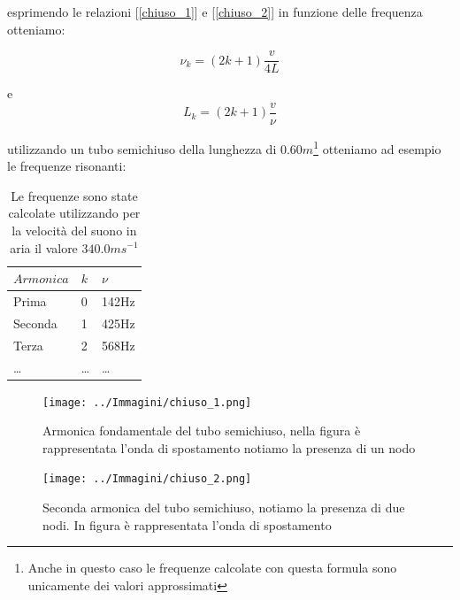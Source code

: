 \documentclass[a4paper,10pt,oneside]{article}
\begin{document}
esprimendo le relazioni [\ref{chiuso_1}] e [\ref{chiuso_2}] in funzione delle frequenza otteniamo:

\begin{equation}
 \nu_k=(2k+1)\frac{v}{4L}
\end{equation}

e
\begin{equation}
 L_k=(2k+1)\frac{v}{\nu}
\end{equation}


utilizzando un tubo semichiuso della lunghezza di $0.60m$\footnote{Anche in questo caso le frequenze calcolate con questa formula sono unicamente dei valori approssimati} otteniamo ad esempio le frequenze risonanti:
\begin{table}[H]
\begin{center}
\begin{tabular}{lll}\toprule
$Armonica$ &$k$&$\nu$\\ \midrule
Prima & 0 & 142Hz\\
Seconda & 1&425Hz\\
Terza & 2&568Hz\\
\ldots &\ldots&\ldots \\ \bottomrule
\end{tabular}\caption{Le frequenze sono state calcolate utilizzando per la velocità del suono in aria il valore $340.0ms^{-1}$}\label{tab:chiuso}
\end{center}
\end{table}

\begin{figure}[H]
 \centering
 \texttt{[image: ../Immagini/chiuso\_1.png]}
 \caption{Armonica fondamentale del tubo semichiuso, nella figura è rappresentata l'onda di spostamento notiamo la presenza di un nodo}
 \label{fig:chiuso_base}
\end{figure}

\begin{figure}[H]
 \centering
 \texttt{[image: ../Immagini/chiuso\_2.png]}
 \caption{Seconda armonica del tubo semichiuso, notiamo la presenza di due nodi. In figura è rappresentata l'onda di spostamento}
 \label{fig:chiuso_seconda}
\end{figure}
\end{document}
